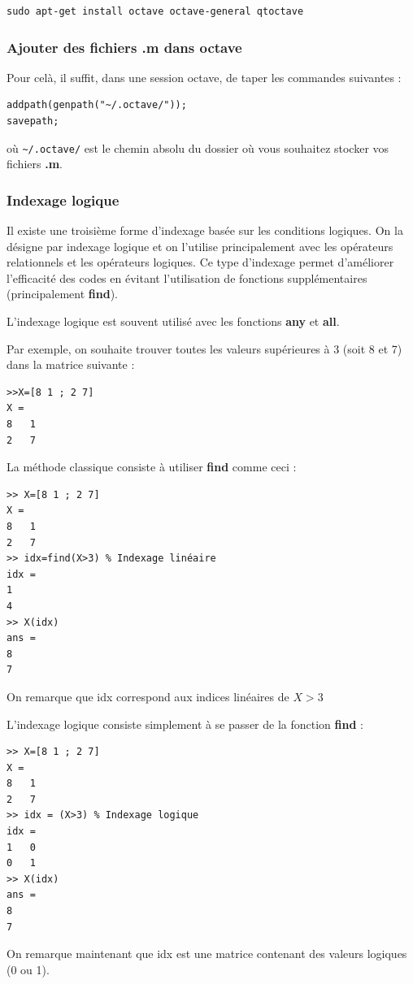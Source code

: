 \documentclass[a4paper,twoside]{article}
\begin{document}
\begin{verbatim}
sudo apt-get install octave octave-general qtoctave
\end{verbatim}

\subsubsection{Ajouter des fichiers .m dans octave}
Pour celà, il suffit, dans une session octave, de taper les commandes suivantes :
\begin{verbatim}
addpath(genpath("~/.octave/"));
savepath;
\end{verbatim}
où \verb|~/.octave/| est le chemin absolu du dossier où vous souhaitez stocker vos fichiers \textbf{.m}.

\subsubsection{Indexage logique}
Il existe une troisième forme d'indexage basée sur les conditions logiques. On la désigne par indexage logique et
on l'utilise principalement avec les opérateurs relationnels et les opérateurs logiques. Ce type d'indexage permet
d'améliorer l'efficacité des codes en évitant l'utilisation de fonctions supplémentaires (principalement \textbf{find}).

\bigskip

L'indexage logique est souvent utilisé avec les fonctions \textbf{any} et \textbf{all}.

Par exemple, on souhaite trouver toutes les valeurs supérieures à 3 (soit 8 et 7) dans la matrice suivante :
\begin{verbatim}
>>X=[8 1 ; 2 7]
X =
8	1
2	7
\end{verbatim}

La méthode classique consiste à utiliser \textbf{find} comme ceci :
\begin{verbatim}
>> X=[8 1 ; 2 7]
X =
8	1
2	7
>> idx=find(X>3) % Indexage linéaire
idx =
1
4
>> X(idx)
ans =
8
7
\end{verbatim}

On remarque que idx correspond aux indices linéaires de $X>3$

L'indexage logique consiste simplement à se passer de la fonction \textbf{find} :
\begin{verbatim}
>> X=[8 1 ; 2 7]
X =
8	1
2	7
>> idx = (X>3) % Indexage logique
idx =
1	0
0	1
>> X(idx)
ans =
8
7

\end{verbatim}
On remarque maintenant que idx est une matrice contenant des valeurs logiques (0 ou 1).
\end{document}

